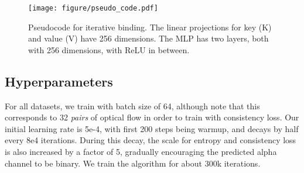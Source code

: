 \begin{figure}[!htb]
\texttt{[image: figure/pseudo\_code.pdf]}
\centering
\caption{Pseudocode for iterative binding. The linear projections for key (K) and value (V) have 256 dimensions. The MLP has two layers, both with 256 dimensions, with ReLU in between. }
\label{fig:code}
\end{figure}

\subsection{Hyperparameters}
For all datasets, we train with batch size of 64, 
although note that this corresponds to 32 \textit{pairs} of optical flow in order to train with consistency loss. 
Our initial learning rate is 5e-4, with first 200 steps being warmup,
and decays by half every 8e4 iterations. 
During this decay, the scale for entropy and consistency loss is also increased by a factor of 5,
gradually encouraging the predicted alpha channel to be binary.
We train the algorithm for about 300k iterations.



